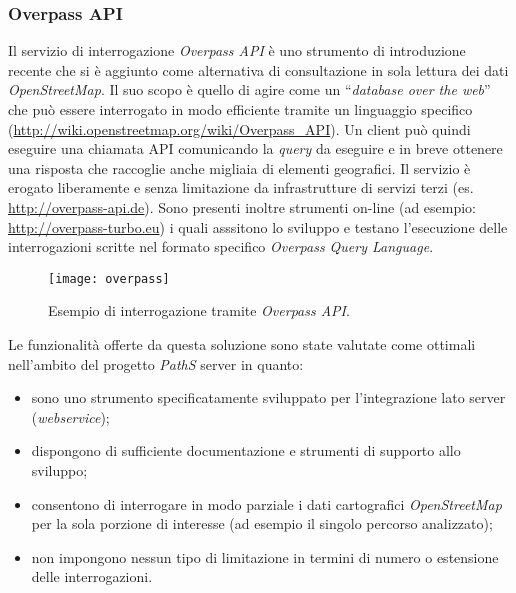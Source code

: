 \subsubsection{Overpass API}
Il servizio di interrogazione \emph{Overpass API} è uno strumento di introduzione recente che si è aggiunto come alternativa di consultazione in sola lettura dei dati \emph{OpenStreetMap}. Il suo scopo è quello di agire come un ``\emph{database over the web}'' che può essere interrogato in modo efficiente tramite un linguaggio specifico (\url{http://wiki.openstreetmap.org/wiki/Overpass_API}). Un client può quindi eseguire una chiamata API comunicando la \emph{query} da eseguire e in breve ottenere una risposta che raccoglie anche migliaia di elementi geografici. Il servizio è erogato liberamente e senza limitazione da infrastrutture di servizi terzi (es. \url{http://overpass-api.de}). Sono presenti inoltre strumenti on-line (ad esempio: \url{http://overpass-turbo.eu}) i quali asssitono lo sviluppo e testano l'esecuzione delle interrogazioni scritte nel formato specifico \emph{Overpass Query Language}.

\begin{figure}[ht]
  \centering
  \texttt{[image: overpass]}
  \caption{\footnotesize{Esempio di interrogazione tramite \emph{Overpass API}.}}
  \label{fig:overpass}
\end{figure}

Le funzionalità offerte da questa soluzione sono state valutate come ottimali nell'ambito del progetto \emph{PathS} server in quanto:
\begin{itemize}
\item sono uno strumento specificatamente sviluppato per l'integrazione lato server (\emph{webservice});
\item dispongono di sufficiente documentazione e strumenti di supporto allo sviluppo;
\item consentono di interrogare in modo parziale i dati cartografici \emph{OpenStreetMap} per la sola porzione di interesse (ad esempio il singolo percorso analizzato);
\item non impongono nessun tipo di limitazione in termini di numero o estensione delle interrogazioni.
\end{itemize}


